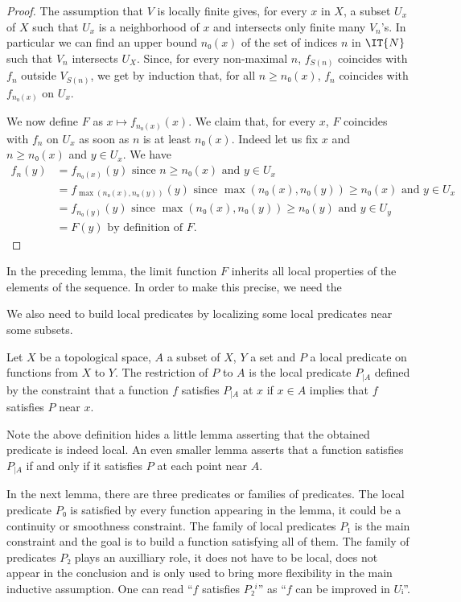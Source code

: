 \begin{proof}\leanok
  The assumption that $V$ is locally finite gives, for every $x$ in $X$, a
  subset $U_x$ of $X$ such that $U_x$ is a neighborhood of $x$ and intersects
  only finite many $V_n$'s. In particular we can find an upper bound $n₀(x)$ of the set
  of indices $n$ in $\IT{N}$ such that $V_n$ intersects $U_X$.
  Since, for every non-maximal $n$, $f_{S(n)}$ coincides with $f_n$ outside
  $V_{S(n)}$, we get by induction that, for all $n ≥ n₀(x)$, $f_n$ coincides
  with $f_{n₀(x)}$ on $U_x$.

  We now define $F$ as $x ↦ f_{n₀(x)}(x)$. We claim that, for every $x$,
  $F$ coincides with $f_n$ on $U_x$ as soon as $n$ is at least $n₀(x)$.
  Indeed let us fix $x$ and $n ≥ n₀(x)$ and $y ∈ U_x$. We have
  \begin{align*}
    f_n(y) &= f_{n₀(x)}(y) \text{ since $n ≥ n₀(x)$ and $y ∈ U_x$}\\
           &= f_{\max(n₀(x), n₀(y))}(y) \text{ since $\max(n₀(x), n₀(y)) ≥ n₀(x)$ and $y ∈ U_x$}\\
           &= f_{n₀(y)}(y) \text{ since $\max(n₀(x), n₀(y)) ≥ n₀(y)$ and $y ∈ U_y$}\\
           &= F(y) \text{ by definition of $F$}.
  \end{align*}
\end{proof}

In the preceding lemma, the limit function $F$ inherits all local properties of
the elements of the sequence. In order to make this precise, we need the

We also need to build local predicates by localizing some local predicates near
some subsets.

\begin{definition}
  \label{def:restrict_germ_predicate}\leanok
  Let $X$ be a topological space, $A$ a subset of $X$, $Y$ a set and $P$ a
  local predicate on functions from $X$ to $Y$. The restriction of $P$ to $A$
  is the local predicate $P_{|A}$ defined by the constraint that a function
  $f$ satisfies $P_{|A}$ at $x$ if $x ∈ A$ implies that $f$ satisfies $P$ near $x$.
\end{definition}

Note the above definition hides a little lemma asserting that the obtained
predicate is indeed local. An even smaller lemma asserts that a function satisfies
$P_{|A}$ if and only if it satisfies $P$ at each point near $A$.

In the next lemma, there are three predicates or families of predicates. The
local predicate $P₀$ is satisfied by every function appearing in the lemma, it
could be a continuity or smoothness constraint. The family of local predicates
$P₁$ is the main constraint and the goal is to build a function satisfying all
of them. The family of predicates $P₂$ plays an auxilliary role, it does not
have to be local, does not appear in the conclusion and is only used to bring more
flexibility in the main inductive assumption. One can read ``$f$ satisfies
$P₂^i$'' as ``$f$ can be improved in $Uᵢ$''.

